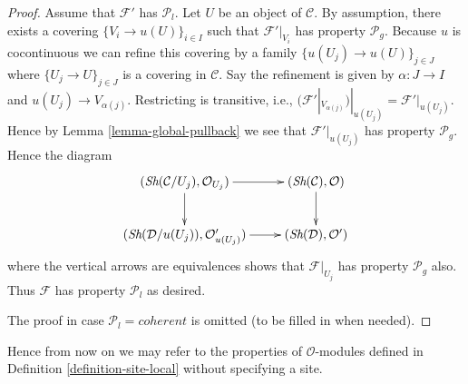 \begin{proof}
\medskip\noindent
Assume that $\mathcal{F}'$ has $\mathcal{P}_l$.
Let $U$ be an object of $\mathcal{C}$.
By assumption, there exists a covering
$\{V_i \to u(U)\}_{i \in I}$ such that $\mathcal{F}'|_{V_i}$
has property $\mathcal{P}_g$. Because $u$ is cocontinuous we
can refine this covering by a family $\{u(U_j) \to u(U)\}_{j \in J}$
where $\{U_j \to U\}_{j \in J}$ is a covering in $\mathcal{C}$.
Say the refinement is given by $\alpha : J \to I$ and
$u(U_j) \to V_{\alpha(j)}$.
Restricting is transitive, i.e.,
$(\mathcal{F}'|_{V_{\alpha(j)}})|_{u(U_j)} = \mathcal{F}'|_{u(U_j)}$.
Hence by Lemma \ref{lemma-global-pullback} we see that
$\mathcal{F}'|_{u(U_j)}$ has property $\mathcal{P}_g$.
Hence the diagram
$$
\xymatrix{
(\textit{Sh}(\mathcal{C}/U_{j}), \mathcal{O}_{U_{j}}) \ar[r] \ar[d] &
(\textit{Sh}(\mathcal{C}), \mathcal{O}) \ar[d] \\
(\textit{Sh}(\mathcal{D}/u(U_{j})), \mathcal{O}'_{u(U_{j})})
\ar[r] &
(\textit{Sh}(\mathcal{D}), \mathcal{O}')
}
$$
where the vertical arrows are equivalences shows that $\mathcal{F}|_{U_j}$
has property $\mathcal{P}_g$ also. Thus $\mathcal{F}$ has
property $\mathcal{P}_l$ as desired.

\medskip\noindent
The proof in case $\mathcal{P}_l = coherent$ is omitted (to be filled in
when needed).
\end{proof}

\noindent
Hence from now on we may refer to the properties of $\mathcal{O}$-modules
defined in Definition \ref{definition-site-local} without specifying a site.

